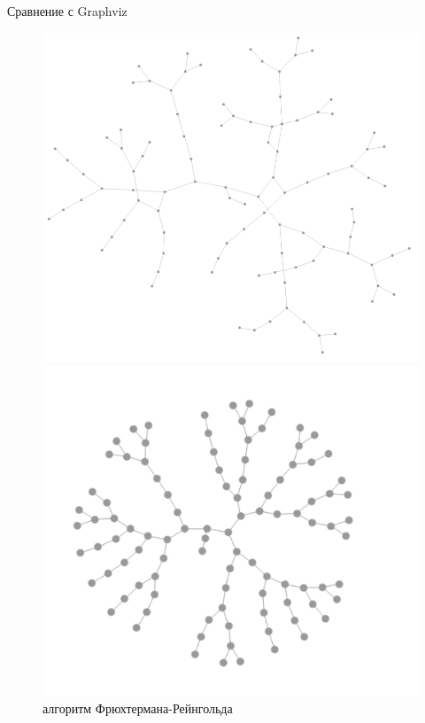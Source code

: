 \documentclass{beamer}
\begin{document}
\begin{frame}{Сравнение с Graphviz}
	\begin{figure}[H]
		\centering
		\begin{minipage}[t]{.32\textwidth}
			\centering
			\includegraphics[width=\linewidth]{./imgs/fr_btree.png}
			\caption*{алгоритм Фрюхтермана-Рейнгольда}
		\end{minipage}
		\noindent
		\begin{minipage}[t]{.32\textwidth}
			\centering
			\includegraphics[width=\linewidth]{./imgs/kk_btree.png}

\end{minipage}
\end{figure}
\end{frame}
\end{document}
